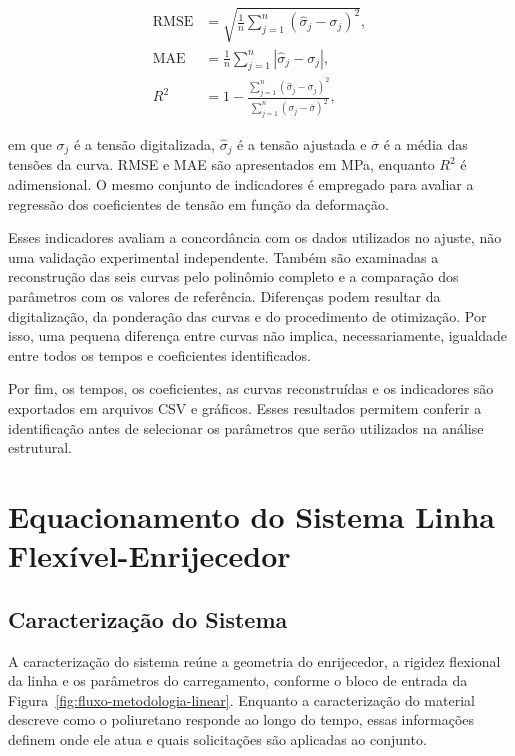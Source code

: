 \documentclass[arial,centeredequations,english,brazilian,oneside,section=TITLE]{ifes8}
\begin{document}
\begin{align}
  \mathrm{RMSE}
  &=\sqrt{\frac{1}{n}\sum_{j=1}^{n}
  \left(\widehat{\sigma}_j-\sigma_j\right)^2},
  \label{eq:rmse-ajuste-material}\\
  \mathrm{MAE}
  &=\frac{1}{n}\sum_{j=1}^{n}
  \left|\widehat{\sigma}_j-\sigma_j\right|,
  \label{eq:mae-ajuste-material}\\
  R^2
  &=1-\frac{\sum_{j=1}^{n}
  \left(\widehat{\sigma}_j-\sigma_j\right)^2}
  {\sum_{j=1}^{n}\left(\sigma_j-\overline{\sigma}\right)^2},
  \label{eq:r2-ajuste-material}
\end{align}

em que $\sigma_j$ é a tensão digitalizada, $\widehat{\sigma}_j$ é a tensão ajustada e
$\overline{\sigma}$ é a média das tensões da curva. RMSE e MAE são apresentados em MPa,
enquanto $R^2$ é adimensional. O mesmo conjunto de indicadores é empregado para avaliar
a regressão dos coeficientes de tensão em função da deformação.

Esses indicadores avaliam a concordância com os dados utilizados no ajuste, não uma validação
experimental independente. Também são examinadas a reconstrução das seis curvas pelo
polinômio completo e a comparação dos parâmetros com os valores de referência. Diferenças
podem resultar da digitalização, da ponderação das curvas e do procedimento de otimização.
Por isso, uma pequena diferença entre curvas não implica, necessariamente, igualdade entre
todos os tempos e coeficientes identificados.

Por fim, os tempos, os coeficientes, as curvas reconstruídas e os indicadores são exportados
em arquivos CSV e gráficos. Esses resultados permitem conferir a identificação antes de
selecionar os parâmetros que serão utilizados na análise estrutural.

\section{Equacionamento do Sistema Linha Flexível-Enrijecedor}
\label{sec:equacionamento-do-sistema}

\subsection{Caracterização do Sistema}
\label{sec:caracterizacao-sistema}

A caracterização do sistema reúne a geometria do enrijecedor, a rigidez flexional da linha
e os parâmetros do carregamento, conforme o bloco de entrada da
Figura~\ref{fig:fluxo-metodologia-linear}. Enquanto a caracterização do material descreve
como o poliuretano responde ao longo do tempo, essas informações definem onde ele atua
e quais solicitações são aplicadas ao conjunto.
\end{document}
